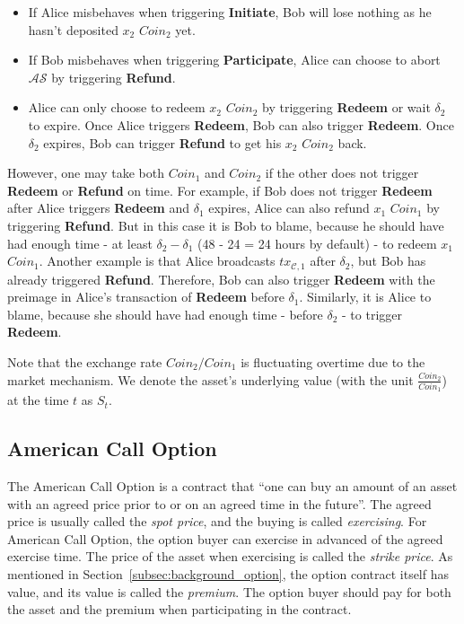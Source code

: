 \begin{itemize}
    \item If Alice misbehaves when triggering \textbf{Initiate}, Bob will lose nothing as he hasn't deposited $x_2$ $Coin_2$ yet.
    \item If Bob misbehaves when triggering \textbf{Participate}, Alice can choose to abort $\mathcal{AS}$ by triggering \textbf{Refund}.
    \item Alice can only choose to redeem $x_2$ $Coin_2$ by triggering \textbf{Redeem} or wait $\delta_2$ to expire.
    Once Alice triggers \textbf{Redeem}, Bob can also trigger \textbf{Redeem}.
    Once $\delta_2$ expires, Bob can trigger \textbf{Refund} to get his $x_2$ $Coin_2$ back.
\end{itemize}

However, one may take both $Coin_1$ and $Coin_2$ if the other does not trigger \textbf{Redeem} or \textbf{Refund} on time.
For example, if Bob does not trigger \textbf{Redeem} after Alice triggers \textbf{Redeem} and $\delta_1$ expires, Alice can also refund $x_1$ $Coin_1$ by triggering \textbf{Refund}.
But in this case it is Bob to blame, because he should have had enough time - at least $\delta_2 - \delta_1$ (48 - 24 = 24 hours by default) - to redeem $x_1$ $Coin_1$.
Another example is that Alice broadcasts $tx_{\mathcal{C}, 1}$ after $\delta_2$, but Bob has already triggered \textbf{Refund}.
Therefore, Bob can also trigger \textbf{Redeem} with the preimage in Alice's transaction of \textbf{Redeem} before $\delta_1$.
Similarly, it is Alice to blame, because she should have had enough time - before $\delta_2$ - to trigger \textbf{Redeem}.

Note that the exchange rate $Coin_2 / Coin_1$ is fluctuating overtime due to the market mechanism.
We denote the asset's underlying value (with the unit $\frac{Coin_2}{Coin_1}$) at the time $t$ as $S_t$.















\subsection{American Call Option}

The American Call Option is a contract that ``one can buy an amount of an asset with an agreed price prior to or on an agreed time in the future''. 
The agreed price is usually called the \textit{spot price}, and the buying is called \textit{exercising}.
For American Call Option, the option buyer can exercise in advanced of the agreed exercise time.
The price of the asset when exercising is called the \textit{strike price}.
As mentioned in Section~\ref{subsec:background_option}, the option contract itself has value, and its value is called the \textit{premium}.
The option buyer should pay for both the asset and the premium when participating in the contract.

